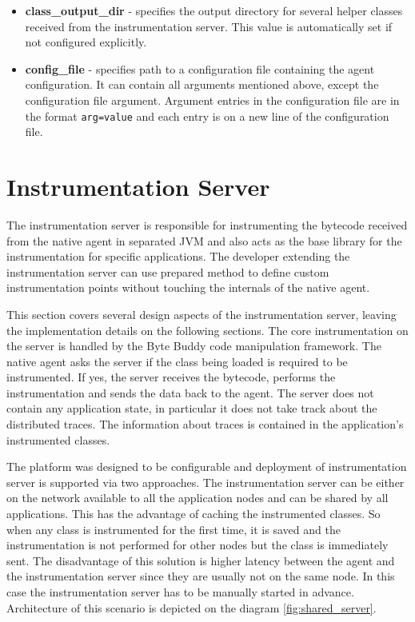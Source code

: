 \begin{itemize}
	\item \textbf{class\_output\_dir} - specifies the output directory for several helper classes received from the instrumentation server. This value is automatically set if not configured explicitly.
	\item \textbf{config\_file} - specifies path to a configuration file containing the agent configuration. It can contain all arguments mentioned above, except the configuration file argument. Argument entries in the configuration file are in the format \texttt{arg=value} and each entry is on a new line of the configuration file. 
\end{itemize}

\section{Instrumentation Server}
\label{sec:inst_server}
The instrumentation server is responsible for instrumenting the bytecode received from the native agent in separated JVM and also acts as the base library for the instrumentation for specific applications. The developer extending the instrumentation server can use prepared method to define custom instrumentation points without touching the internals of the native agent.

This section covers several design aspects of the instrumentation server, leaving the implementation details on the following sections. The core instrumentation on the server is handled by the Byte Buddy code manipulation framework. The native agent asks the server if the class being loaded is required to be instrumented. If yes, the server receives the bytecode, performs the instrumentation and sends the data back to the agent. The server does not contain any application state, in particular it does not take track about the distributed traces. The information about traces is contained in the application's instrumented classes.

The platform was designed to be configurable and deployment of instrumentation server is supported via two approaches. The instrumentation server can be either on the network available to all the application nodes and can be shared by all applications. This has the advantage of caching the instrumented classes. So when any class is instrumented for the first time, it is saved and the instrumentation is not performed for other nodes but the class is immediately sent. The disadvantage of this solution is higher latency between the agent and the instrumentation server since they are usually not on the same node. In this case the instrumentation server has to be manually started in advance. Architecture of this scenario is depicted on the diagram \ref{fig:shared_server}.
 
